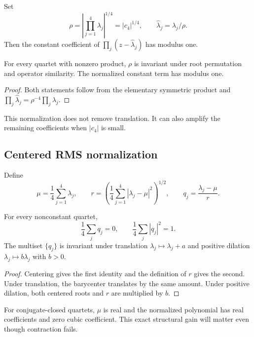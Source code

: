 \documentclass[12pt]{article}
\theoremstyle{remark}\newtheorem{remark}[theorem]{Remark}
\begin{document}
Set
\begin{equation}\label{eq:detradius}
 \rho=\left|\prod_{j=1}^{4}\lambda_j\right|^{1/4}
      =|c_4|^{1/4},\qquad \widehat\lambda_j=\lambda_j/\rho.
\end{equation}
Then the constant coefficient of
$\prod_j(z-\widehat\lambda_j)$ has modulus one.

\begin{proposition}\label{prop:detintrinsic}
For every quartet with nonzero product, $\rho$ is invariant under root
permutation and operator similarity.  The normalized constant term has
modulus one.
\end{proposition}
\begin{proof}
Both statements follow from the elementary symmetric product and
$\prod_j\widehat\lambda_j=\rho^{-4}\prod_j\lambda_j$.
\end{proof}

This normalization does not remove translation.  It can also amplify the
remaining coefficients when $|c_4|$ is small.

\subsection{Centered RMS normalization}

Define
\begin{equation}\label{eq:rms}
 \mu=\frac14\sum_{j=1}^{4}\lambda_j,
 \qquad
 r=\left(\frac14\sum_{j=1}^{4}|\lambda_j-\mu|^2\right)^{1/2},
 \qquad q_j=\frac{\lambda_j-\mu}{r}.
\end{equation}

\begin{proposition}\label{prop:rmsgauge}
For every nonconstant quartet,
\begin{equation}
 \frac14\sum_j q_j=0,
 \qquad \frac14\sum_j|q_j|^2=1.
\end{equation}
The multiset $\{q_j\}$ is invariant under translation
$\lambda_j\mapsto\lambda_j+a$ and positive dilation
$\lambda_j\mapsto b\lambda_j$ with $b>0$.
\end{proposition}
\begin{proof}
Centering gives the first identity and the definition of $r$ gives the
second.  Under translation, the barycenter translates by the same amount.
Under positive dilation, both centered roots and $r$ are multiplied by $b$.
\end{proof}

For conjugate-closed quartets, $\mu$ is real and the normalized polynomial
has real coefficients and zero cubic coefficient.  This exact structural
gain will matter even though contraction fails.
\end{document}
